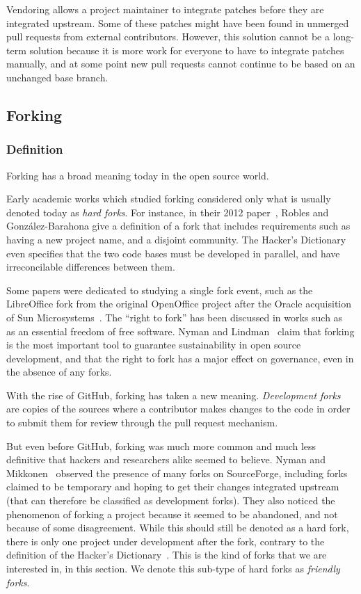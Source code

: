Vendoring allows a project maintainer to integrate patches before they are integrated upstream.
Some of these patches might have been found in unmerged pull requests from external contributors.
However, this solution cannot be a long-term solution because it is more work for everyone to have to integrate patches manually, and at some point new pull requests cannot continue to be based on an unchanged base branch.

\subsection{Forking}

\subsubsection{Definition}

Forking has a broad meaning today in the open source world.

Early academic works which studied forking considered only what is usually denoted today as \emph{hard forks}.
For instance, in their 2012 paper~\cite{robles2012comprehensive}, Robles and Gonz\'alez-Barahona give a definition of a fork that includes requirements such as having a new project name, and a disjoint community.
The Hacker's Dictionary~\cite{raymond1996new} even specifies that the two code bases must be developed in parallel, and have irreconcilable differences between them.

Some papers were dedicated to studying a single fork event, such as the LibreOffice fork from the original OpenOffice project after the Oracle acquisition of Sun Microsystems~\cite{gamalielsson2014sustainability}.
The ``right to fork'' has been discussed in works such as~\cite[page~64]{weber2004success} as an essential freedom of free software.
Nyman and Lindman~\cite{nyman2013code} claim that forking is the most important tool to guarantee sustainability in open source development, and that the right to fork has a major effect on governance, even in the absence of any forks.

With the rise of GitHub, forking has taken a new meaning.
\emph{Development forks}~\cite[Chapter~8]{fogel2005producing} are copies of the sources where a contributor makes changes to the code in order to submit them for review through the pull request mechanism.

But even before GitHub, forking was much more common and much less definitive that hackers and researchers alike seemed to believe.
Nyman and Mikkonen~\cite{nyman2011fork} observed the presence of many forks on SourceForge, including forks claimed to be temporary and hoping to get their changes integrated upstream (that can therefore be classified as development forks).
They also noticed the phenomenon of forking a project because it seemed to be abandoned, and not because of some disagreement.
While this should still be denoted as a hard fork, there is only one project under development after the fork, contrary to the definition of the Hacker's Dictionary~\cite{raymond1996new}.
This is the kind of forks that we are interested in, in this section.
We denote this sub-type of hard forks as \emph{friendly forks}.

